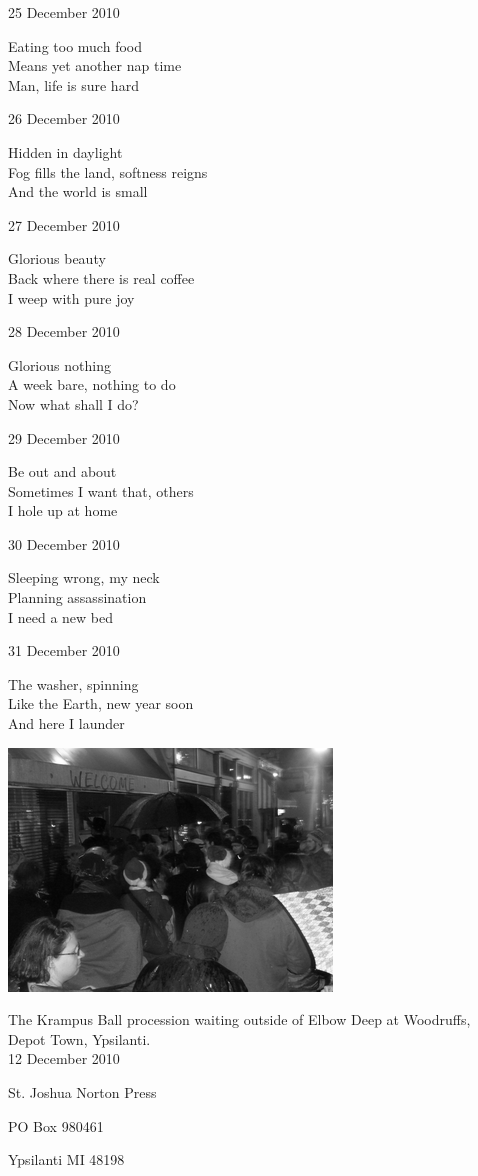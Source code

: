 \documentclass[12pt]{article}
\begin{document}
25 December 2010

Eating too much food \\
Means yet another nap time \\
Man, life is sure hard

26 December 2010

Hidden in daylight \\
Fog fills the land, softness reigns \\
And the world is small

27 December 2010

Glorious beauty \\
Back where there is real coffee \\
I weep with pure joy

28 December 2010

Glorious nothing \\
A week bare, nothing to do \\
Now what shall I do?

29 December 2010

Be out and about \\
Sometimes I want that, others \\
I hole up at home

30 December 2010

Sleeping wrong, my neck \\
Planning assassination \\
I need a new bed

31 December 2010

The washer, spinning \\
Like the Earth, new year soon \\
And here I launder

\newpage

\begin{center}
\includegraphics{krampus.png}

The Krampus Ball procession waiting outside of Elbow Deep at Woodruffs, Depot Town, Ypsilanti. \\
12 December 2010

\end{center}


\newpage

\thispagestyle{empty}
\vspace*{12cm}
\begin{sideways}
\Large{St. Joshua Norton Press}
\end{sideways}
\begin{sideways}
\Large{PO Box 980461}
\end{sideways}
\begin{sideways}
\Large{Ypsilanti MI 48198}
\end{sideways}
\end{document}
